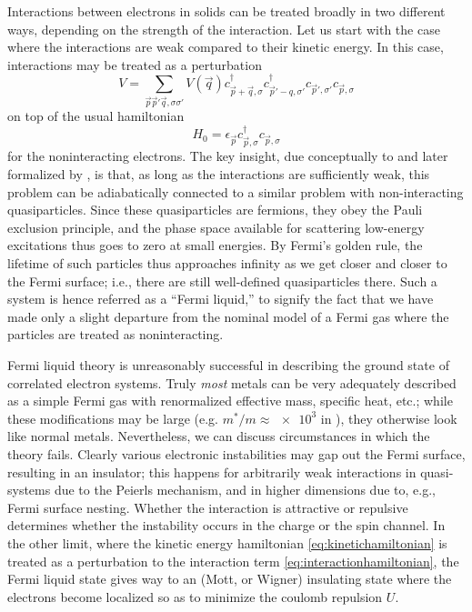 Interactions between electrons in solids can be treated broadly in two different ways, depending on the strength of the interaction.
Let us start with the case where the interactions are weak compared to their kinetic energy.
In this case, interactions may be treated as a perturbation
\begin{equation}\label{eq:interactionhamiltonian}
V = \sum_{\vec{p}\vec{p}'\vec{q},\sigma\sigma'}V(\vec{q})c^\dagger_{\vec{p}+\vec{q},\sigma}c^\dagger_{\vec{p}'-q,\sigma'}c_{\vec{p}',\sigma'}c_{\vec{p},\sigma}
\end{equation}
on top of the usual hamiltonian
\begin{equation}\label{eq:kinetichamiltonian}
H_0 = \epsilon_{\vec{p}} c^\dagger_{\vec{p},\sigma}c_{\vec{p},\sigma}
\end{equation}
for the noninteracting electrons.
The key insight, due conceptually to \citet{landau_theory_1957} and later formalized by \citet{gell-mann_bound_1951}, is that, as long as the interactions are sufficiently weak, this problem can be adiabatically connected to a similar problem with non-interacting quasiparticles.
Since these quasiparticles are fermions, they obey the Pauli exclusion principle, and the phase space available for scattering low-energy excitations thus goes to zero at small energies.
By Fermi's golden rule, the lifetime of such particles thus approaches infinity as we get closer and closer to the Fermi surface; i.e., there are still well-defined quasiparticles there.
Such a system is hence referred as a ``Fermi liquid,'' to signify the fact that we have made only a slight departure from the nominal model of a Fermi gas where the particles are treated as noninteracting.

Fermi liquid theory is unreasonably successful in describing the ground state of correlated electron systems.
Truly \emph{most} metals can be very adequately described as a simple Fermi gas with renormalized effective mass, specific heat, etc.; while these modifications may be large (e.g. $m^*/m\approx\num{e3}$ in ), they otherwise look like normal metals.
Nevertheless, we can discuss circumstances in which the theory fails.
Clearly various electronic instabilities may gap out the Fermi surface, resulting in an insulator; this happens for arbitrarily weak interactions in quasi-\oned systems due to the Peierls mechanism, and in higher dimensions due to, e.g., Fermi surface nesting.
Whether the interaction is attractive or repulsive determines whether the instability occurs in the charge or the spin channel.
In the other limit, where the kinetic energy hamiltonian \ref{eq:kinetichamiltonian} is treated as a perturbation to the interaction term \ref{eq:interactionhamiltonian}, the Fermi liquid state gives way to an (Mott, or Wigner) insulating state where the electrons become localized so as to minimize the coulomb repulsion $U$.

